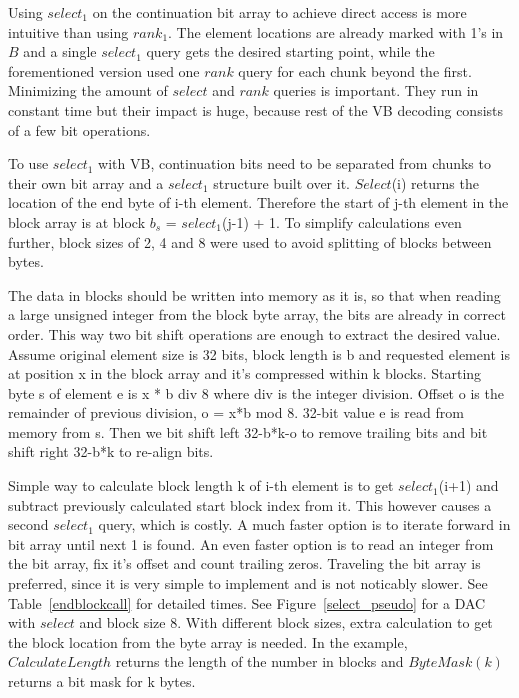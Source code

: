 Using $select_1$ on the continuation bit array to achieve direct access is more intuitive than using $rank_1$. The element locations are already marked with 1's 
in $B$ and a single $select_1$ query gets the desired starting point, while the forementioned version \citep{Bri09} used one $rank$ query for each chunk beyond 
the first. Minimizing the amount of $select$ and $rank$ queries is important. They run in constant time but their impact is huge, because rest of the VB decoding 
consists of a few bit operations. 

To use $select_1$ with VB, continuation bits need to be separated from chunks to their own bit array and a $select_1$ structure built over it. $Select$(i) returns the
location of the end byte of i-th element. Therefore the start of j-th element in the block array is at block $b_s$ = $select_1$(j-1) + 1. To simplify calculations even further,
block sizes of 2, 4 and 8 were used to avoid splitting of blocks between bytes.

The data in blocks should be written into memory as it is, so that when reading a large unsigned integer from the block byte array, the bits are already in correct order. 
This way two bit shift operations are enough to extract the desired value.  Assume original element size is 32 bits, block length is b and requested
element is at position x in the block array and it's compressed within k blocks. Starting byte s of element e is x * b div 8 where div is the integer division. Offset o
is the remainder of previous division, o = x*b mod 8. 32-bit value e is read from memory from s. Then we bit shift left 32-b*k-o to remove trailing bits and bit shift right
32-b*k to re-align bits. 

Simple way to calculate block length k of i-th element is to get $select_1$(i+1) and subtract previously calculated start block index from it. This however causes a second 
$select_1$ query, which is costly. A much faster option is to iterate forward in bit array until next 1 is found. An even faster option is to read an integer from 
the bit array, fix it's offset and count trailing zeros. Traveling the bit array is preferred, since it is very simple to implement and is not noticably slower. See 
Table~\ref{endblockcall} for detailed times. See Figure~\ref{select_pseudo} for a DAC with $select$ and block size 8. With different block sizes, extra calculation to get 
the block location from the byte array is needed. In the example, $CalculateLength$ returns the length of the number in blocks and $ByteMask(k)$ returns a bit mask for k bytes. 


